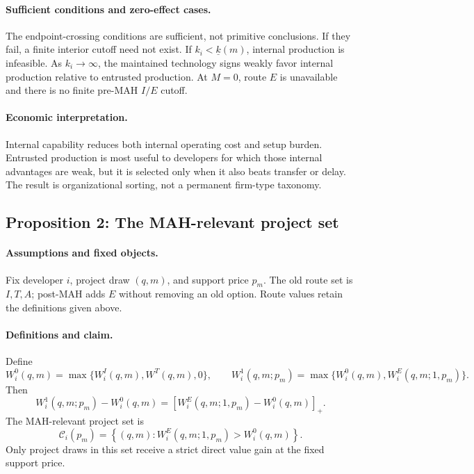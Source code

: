 \paragraph{Sufficient conditions and zero-effect cases.}
The endpoint-crossing conditions are sufficient, not primitive conclusions.
If they fail, a finite interior cutoff need not exist. If
\(k_i<\underline{k}(m)\), internal production is infeasible. As
\(k_i\rightarrow\infty\), the maintained technology signs weakly favor
internal production relative to entrusted production. At \(M=0\), route \(E\)
is unavailable and there is no finite pre-MAH \(I/E\) cutoff.

\paragraph{Economic interpretation.}
Internal capability reduces both internal operating cost and setup burden.
Entrusted production is most useful to developers for which those internal
advantages are weak, but it is selected only when it also beats transfer or
delay. The result is organizational sorting, not a permanent firm-type
taxonomy.

\subsection{Proposition 2: The MAH-relevant project set}
\label{prop:p08-relevant-set}

\paragraph{Assumptions and fixed objects.}
Fix developer \(i\), project draw \((q,m)\), and support price \(p_m\).
The old route set is \(I,T,A\); post-MAH adds \(E\) without removing an old
option. Route values retain the definitions given above.

\paragraph{Definitions and claim.}
Define
\begin{equation}
  W_i^0(q,m)
  =
  \max\{W_i^I(q,m),W^T(q,m),0\},
  \qquad
  W_i^1(q,m;p_m)
  =
  \max\{W_i^0(q,m),W_i^E(q,m;1,p_m)\}.
  \label{eq:p08-old-new-values}
\end{equation}
Then
\begin{equation}
  W_i^1(q,m;p_m)-W_i^0(q,m)
  =
  \left[W_i^E(q,m;1,p_m)-W_i^0(q,m)\right]_+.
  \label{eq:p08-positive-part-gain}
\end{equation}
The MAH-relevant project set is
\begin{equation}
  \mathcal C_i(p_m)
  =
  \left\{(q,m):
  W_i^E(q,m;1,p_m)>W_i^0(q,m)\right\}.
  \label{eq:p08-relevant-set}
\end{equation}
Only project draws in this set receive a strict direct value gain at the fixed
support price.

